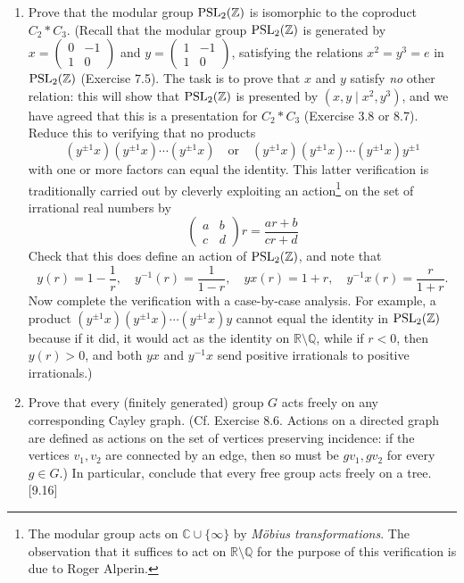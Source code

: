 \begin{enumerate}
      \item Prove that the modular group $\operatorname{PSL}_2(\mathbb{Z})$ is isomorphic to the coproduct $C_2 \ast C_3$.
            (Recall that the modular group $\operatorname{PSL}_2(\mathbb{Z})$ is generated by $x = \begin{pmatrix} 0 & -1 \\ 1 & 0 \end{pmatrix}$ and $y = \begin{pmatrix} 1 & -1 \\ 1 & 0 \end{pmatrix}$, satisfying the relations $x^2 = y^3 = e$ in $\operatorname{PSL}_2(\mathbb{Z})$ (Exercise 7.5). The task is to prove that $x$ and $y$ satisfy \emph{no} other relation: this will show that $\operatorname{PSL}_2(\mathbb{Z})$ is presented by $(x, y \mid x^2, y^3)$, and we have agreed that this is a presentation for $C_2 \ast C_3$ (Exercise 3.8 or 8.7). Reduce this to verifying that no products
            \[ (y^{\pm 1}x)(y^{\pm 1}x) \cdots (y^{\pm 1}x) \quad \text{or} \quad (y^{\pm 1}x)(y^{\pm 1}x) \cdots (y^{\pm 1}x) y^{\pm 1} \]
            with one or more factors can equal the identity. This latter verification is traditionally carried out by cleverly exploiting an action\footnote{The modular group acts on $\mathbb{C} \cup \{\infty\}$ by \emph{Möbius transformations}. The observation that it suffices to act on $\mathbb{R} \setminus \mathbb{Q}$ for the purpose of this verification is due to Roger Alperin.} on the set of irrational real numbers by
            \[ \begin{pmatrix} a & b \\ c & d \end{pmatrix} r = \frac{ar+b}{cr+d} \]
            Check that this does define an action of $\operatorname{PSL}_2(\mathbb{Z})$, and note that
            \[ y(r) = 1-\frac{1}{r}, \quad
                  y^{-1}(r) = \frac1{1-r}, \quad
                  yx(r) = 1+r, \quad
                  y^{-1}x(r) = \frac{r}{1+r}. \]
            Now complete the verification with a case-by-case analysis. For example, a product $(y^{\pm 1}x)(y^{\pm 1}x) \cdots (y^{\pm 1}x)y$ cannot equal the identity in $\operatorname{PSL}_2(\mathbb{Z})$ because if it did, it would act as the identity on $\mathbb{R} \setminus \mathbb{Q}$, while if $r < 0$, then $y(r) > 0$, and both $yx$ and $y^{-1}x$ send positive irrationals to positive irrationals.)

      \item Prove that every (finitely generated) group $G$ acts freely on any corresponding Cayley graph. (Cf. Exercise 8.6. Actions on a directed graph are defined as actions on the set of vertices preserving incidence: if the vertices $v_1, v_2$ are connected by an edge, then so must be $gv_1, gv_2$ for every $g \in G$.) In particular, conclude that every free group acts freely on a tree. [9.16]


\end{enumerate}

